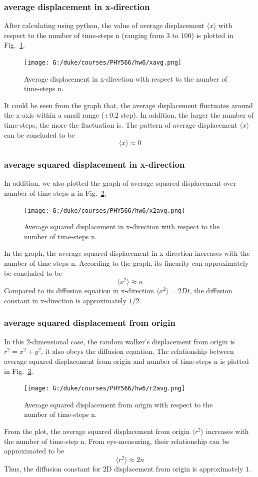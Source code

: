\documentclass[a4paper,12pt]{article}
\begin{document}
\subsubsection{average displacement in x-direction}
After calculating using python, the value of average displacement $\langle x \rangle$ with respect to the number of time-steps n (ranging from $3$ to $100$) is plotted in Fig.~\ref{Fig:xavg}. \\
\begin{figure}[!htb]
  \centering
  \texttt{[image: G:/duke/courses/PHY566/hw6/xavg.png]}
  \caption{Average displacement in x-direction with respect to the number of time-steps n.}
  \label{Fig:xavg}
\end{figure}
It could be seen from the graph that, the average displacement fluctuates around the x-axis within a small range ($\pm 0.2$ step). In addition, the larger the number of time-steps, the more the fluctuation is. The pattern of average displacement $\langle x \rangle$ can be concluded to be $$\langle x \rangle \approx 0$$

\subsubsection{average squared displacement in x-direction}
In addition, we also plotted the graph of average squared displacement over number of time-steps n in Fig.~\ref{Fig:x2avg}. \\
\begin{figure}[!htb]
  \centering
  \texttt{[image: G:/duke/courses/PHY566/hw6/x2avg.png]}
  \caption{Average squared displacement in x-direction with respect to the number of time-steps n.}
  \label{Fig:x2avg}
\end{figure}
In the graph, the average squared displacement in x-direction increases with the number of time-steps n. According to the graph, its linearity can approximately be concluded to be $$\langle x^2 \rangle \approx n$$ Compared to its diffusion equation in x-direction $\langle x^2 \rangle = 2Dt$, the diffusion constant in x-direction is approximately $1/2$.

\subsubsection{average squared displacement from origin}
In this $2$-dimensional case, the random walker's displacement from origin is $r^2 = x^2 + y^2$, it also obeys the diffusion equation. The relationship between average squared displacement from origin and number of time-steps n is plotted in Fig.~\ref{Fig:r2avg}. \\
\begin{figure}[!htb]
  \centering
  \texttt{[image: G:/duke/courses/PHY566/hw6/r2avg.png]}
  \caption{Average squared displacement from origin with respect to the number of time-steps n.}
  \label{Fig:r2avg}
\end{figure}
From the plot, the average squared displacement from origin $\langle r^2 \rangle$ increases with the number of time-step n. From eye-measuring, their relationship can be approximated to be $$\langle r^2 \rangle \approx 2n$$ Thus, the diffusion constant for 2D displacement from origin is approximately $1$.
\end{document}
